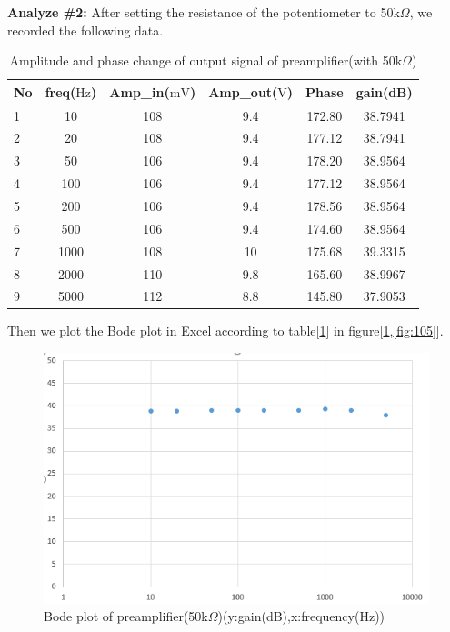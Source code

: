 \textbf{Analyze \#2:} \newline
\phantom{ } After setting the resistance of the potentiometer to 50$ \si{\kilo\Omega} $, we recorded the following data.
\begin{table}[!htbp]
	\centering
	\caption{Amplitude and phase change of output signal of preamplifier(with 50$ \si{\kilo\Omega} $)}
	\begin{tabular}{lccccc}
		\toprule
		No &freq($\si{\hertz}$) &Amp\_in($\si{\milli\volt}$)&Amp\_out($\si{\volt}$)&Phase&gain(dB)\\
		\midrule
		1	&10		&108	&9.4	&172.80	&38.7941\\
		2	&20		&108	&9.4	&177.12	&38.7941\\
		3	&50		&106	&9.4	&178.20	&38.9564\\
		4	&100	&106	&9.4	&177.12	&38.9564\\
		5	&200	&106	&9.4	&178.56	&38.9564\\
		6	&500	&106	&9.4	&174.60	&38.9564\\
		7	&1000	&108	&10		&175.68	&39.3315\\
		8	&2000	&110	&9.8	&165.60	&38.9967\\
		9	&5000	&112	&8.8	&145.80	&37.9053\\
		\bottomrule
	\end{tabular}
	\label{tab:preamp50}
\end{table}

\phantom{ } Then we plot the Bode plot in Excel according to table[\ref{tab:preamp50}] in figure[\ref{fig:104},\ref{fig:105}].
\begin{figure}[!htbp]
	\centering 
	\begin{framed}
		\includegraphics[width=\linewidth]{images/1_3.PNG} 
		\caption{Bode plot of preamplifier(50$ \si{\kilo\Omega} $)(y:gain(dB),x:frequency(Hz))}
		\label{fig:104} 
	\end{framed}
\end{figure} 

